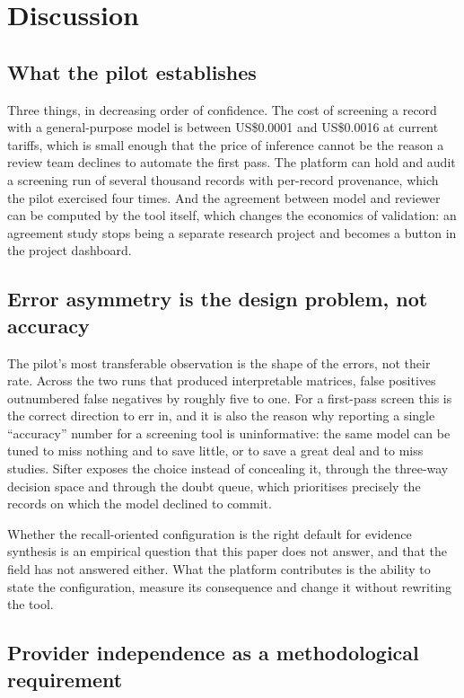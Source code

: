 \section{Discussion}\label{sec:discussion}

\subsection{What the pilot establishes}

Three things, in decreasing order of confidence. The cost of screening a
record with a general-purpose model is between US\$0.0001 and US\$0.0016 at
current tariffs, which is small enough that the price of inference cannot be
the reason a review team declines to automate the first pass. The platform can
hold and audit a screening run of several thousand records with per-record
provenance, which the pilot exercised four times. And the agreement between
model and reviewer can be computed by the tool itself, which changes the
economics of validation: an agreement study stops being a separate research
project and becomes a button in the project dashboard.

\subsection{Error asymmetry is the design problem, not accuracy}

The pilot's most transferable observation is the shape of the errors, not their
rate. Across the two runs that produced interpretable matrices, false positives
outnumbered false negatives by roughly five to one. For a first-pass screen
this is the correct direction to err in, and it is also the reason why
reporting a single ``accuracy'' number for a screening tool is uninformative:
the same model can be tuned to miss nothing and to save little, or to save a
great deal and to miss studies. Sifter exposes the choice instead of concealing
it, through the three-way decision space and through the doubt queue, which
prioritises precisely the records on which the model declined to commit.

Whether the recall-oriented configuration is the right default for evidence
synthesis is an empirical question that this paper does not answer, and that
the field has not answered either. What the platform contributes is the
ability to state the configuration, measure its consequence and change it
without rewriting the tool.

\subsection{Provider independence as a methodological requirement}


